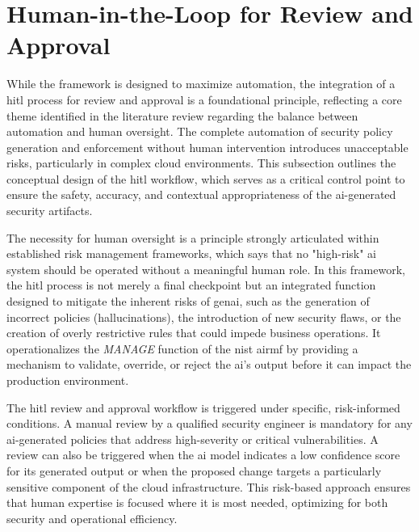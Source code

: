 
\section{Human-in-the-Loop for Review and Approval} %
\label{sub:Human-in-the-Loop for Review and Approval}

While the framework is designed to maximize automation, the integration of a \gls{hitl} process for review and approval is a foundational principle, reflecting a core theme identified in the literature review regarding the balance between automation and human oversight. The complete automation of security policy generation and enforcement without human intervention introduces unacceptable risks, particularly in complex cloud environments. This subsection outlines the conceptual design of the \gls{hitl} workflow, which serves as a critical control point to ensure the safety, accuracy, and contextual appropriateness of the \gls{ai}-generated security artifacts.

The necessity for human oversight is a principle strongly articulated within established risk management frameworks, which says that no "high-risk" \gls{ai} system should be operated without a meaningful human role. In this framework, the \gls{hitl} process is not merely a final checkpoint but an integrated function designed to mitigate the inherent risks of \gls{genai}, such as the generation of incorrect policies (hallucinations), the introduction of new security flaws, or the creation of overly restrictive rules that could impede business operations. It operationalizes the \textit{MANAGE} function of the \gls{nist} \gls{airmf} by providing a mechanism to validate, override, or reject the \gls{ai}'s output before it can impact the production environment\cite{barrett_actionable_2023}.

The \gls{hitl} review and approval workflow is triggered under specific, risk-informed conditions. A manual review by a qualified security engineer is mandatory for any \gls{ai}-generated policies that address high-severity or critical vulnerabilities. A review can also be triggered when the \gls{ai} model indicates a low confidence score for its generated output or when the proposed change targets a particularly sensitive component of the cloud infrastructure. This risk-based approach ensures that human expertise is focused where it is most needed, optimizing for both security and operational efficiency.

